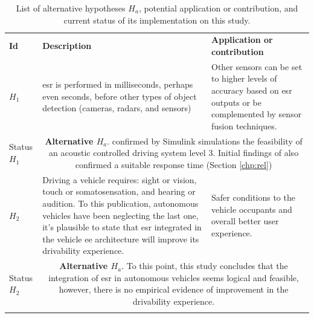 \begin{table}[ht!]
    \caption[List of alternative hypotheses $H_a$ defined during the study development ]{List of alternative hypotheses $H_a$, potential application or contribution, and current status of its implementation on this study.}
    \label{table:hypotheses_list_ha}
    \centering
    \begin{tabular}{p{1.7cm}|p{6.5cm}|p{6.5cm}}
        \Xhline{2\arrayrulewidth} 
        \rowcolor{lightgray}
        \textbf{Id} & \textbf{Description} & \textbf{Application or contribution} \\
        $H_1$ & 
        \gls{esr} is performed in milliseconds, perhaps even seconds, before other types of object detection (cameras, radars, and sensors) & 
        Other sensors can be set to higher levels of accuracy based on \gls{esr} outputs or be complemented by sensor fusion techniques. \\
        \hline
        \rowcolor{gray!20} Status $H_1$ & \multicolumn{2}{c}{\parbox{13.4cm}{\textbf{Alternative $H_a$}. \textcite{Veeraraghavan2020} confirmed by  Simulink simulations the feasibility of an acoustic controlled driving system level 3. Initial findings of \textcite{Yin2023} also confirmed a suitable response time (Section \ref{chp:rel}) }} \\       
        \hline \hline
        $H_2$ & 
        Driving a vehicle requires: sight or vision, touch or somatosensation, and hearing or audition. To this publication, autonomous vehicles have been neglecting the last one, it’s plausible to state that \gls{esr} integrated in the vehicle \gls{ee} architecture will improve its drivability experience. & 
        Safer conditions to the vehicle occupants and overall better user experience.\\
        \hline
        \rowcolor{gray!20} Status $H_2$ & \multicolumn{2}{c}{\parbox{13.4cm}{\textbf{Alternative $H_a$}. To this point, this study concludes that the integration of \gls{esr} in autonomous vehicles seems logical and feasible, however, there is no empirical evidence of improvement in the drivability experience.}} \\       
        \Xhline{2\arrayrulewidth}
    \end{tabular}
\end{table}


